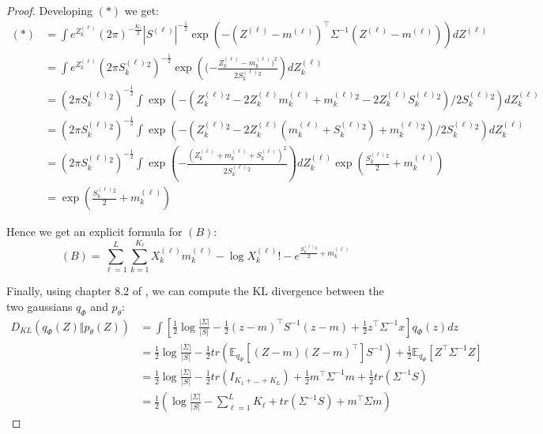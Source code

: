 \begin{proof}
    Developing $(*)$ we get:
    $$
    \begin{align}
        (*) &= \int e^{Z_k^{(\ell)}} (2\pi)^{-\frac{K_{\ell}}{2}} |S^{(\ell)}|^{-\frac12} \exp(-(Z^{(\ell)} - m^{(\ell)})^\top \Sigma^{-1} (Z^{(\ell)} - m^{(\ell)})) dZ^{(\ell)} \\
            &= \int e^{Z_k^{(\ell)}} (2\pi S_k^{(\ell)}^2)^{-\frac12} \exp\left((-\frac{Z_k^{(\ell)} - m_k^{(\ell)})^2}{2 S_k^{(\ell)}^2}\right) dZ_k^{(\ell)} \\
            &= (2\pi S_k^{(\ell)}^2)^{-\frac12} \int \exp\left(-(Z_k^{(\ell)}^2 - 2 Z_k^{(\ell)} m_k^{(\ell)} + m_k^{(\ell)}^2 - 2 Z_k^{(\ell)} S_k^{(\ell)}^2) / 2 S_k^{(\ell)}^2\right) dZ_k^{(\ell)} \\
            &= (2\pi S_k^{(\ell)}^2)^{-\frac12} \int \exp\left(-(Z_k^{(\ell)}^2 - 2 Z_k^{(\ell)} (m_k^{(\ell)} + S_k^{(\ell)}^2) + m_k^{(\ell)}^2) / 2 S_k^{(\ell)}^2\right) dZ_k^{(\ell)} \\
            &= (2\pi S_k^{(\ell)}^2)^{-\frac12} \int \exp\left(-\frac{(Z_k^{(\ell)} + m_k^{(\ell)} + S_k^{(\ell)})^2}{2 S_k^{(\ell)}^2}\right) dZ_k^{(\ell)} \exp\left(\frac{S_k^{(\ell)}^2}{2} + m_k^{(\ell)}\right) \\
            &= \exp\left(\frac{S_k^{(\ell)}^2}{2} + m_k^{(\ell)}\right)
    \end{align}
    $$

    Hence we get an explicit formula for $(B)$:
    $$
    (B) = \sum_{\ell=1}^L \sum_{k=1}^{K_{\ell}} X_k^{(\ell)} m_k^{(\ell)} - \log X_k^{(\ell)}! - e^{\frac{S_k^{(\ell)}^2}{2} + m_k^{(\ell)}}
    $$

    Finally, using chapter 8.2 of \cite{matrixcookbook}, we can compute the KL divergence between the two gaussians $q_{\Phi}$ and $p_{\theta}$:
    $$
    \begin{align}
        D_{KL}(q_{\Phi}(Z) \Vert p_{\theta}(Z)) &= \int \left[\frac12 \log \frac{|\Sigma|}{|S|} - \frac12 (z - m)^{\top} S^{-1} (z - m) + \frac12 z^{\top} \Sigma^{-1} x \right] q_{\Phi}(z) dz \\
                                                &= \frac12 \log \frac{|\Sigma|}{|S|} - \frac12 tr(\mathbb{E}_{q_{\Phi}}[(Z - m)(Z - m)^{\top}] S^{-1}) + \frac12 \mathbb{E}_{q_{\Phi}}[Z^{\top} \Sigma^{-1} Z] \\
                                                &= \frac12 \log \frac{|\Sigma|}{|S|} - \frac12 tr(I_{K_1 + \dots + K_{L}}) + \frac12 m^{\top} \Sigma^{-1} m + \frac12 tr(\Sigma^{-1} S) \\
                                                &= \frac12 \left(\log \frac{|\Sigma|}{|S|} - \sum_{\ell=1}^L K_{\ell} + tr(\Sigma^{-1} S) + m^{\top} \Sigma m \right)
    \end{align}
    $$


\end{proof}
